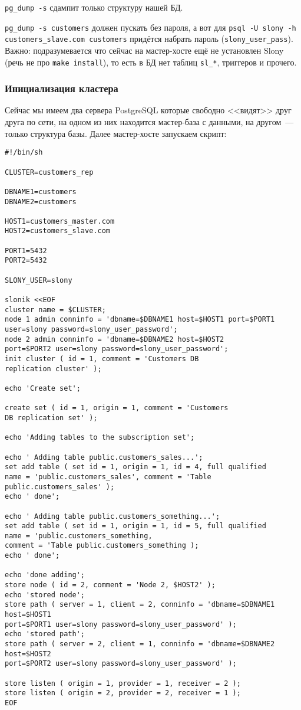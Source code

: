 \lstinline!pg_dump -s! сдампит только структуру нашей БД.

\lstinline!pg_dump -s customers! должен пускать без пароля, а вот для \lstinline!psql -U slony -h customers_slave.com customers! придётся набрать пароль (\lstinline!slony_user_pass!). Важно: подразумевается что сейчас на мастер-хосте ещё не установлен Slony (речь не про \lstinline!make install!), то есть в БД нет таблиц \lstinline!sl_*!, триггеров и прочего.

\subsubsection{Инициализация кластера}

Сейчас мы имеем два сервера PostgreSQL которые свободно <<видят>> друг друга по сети, на одном из них находится мастер-база с данными, на другом~--- только структура базы. Далее мастер-хосте запускаем скрипт:

\begin{lstlisting}[label=lst:slony9,caption=Инициализация кластера]
#!/bin/sh

CLUSTER=customers_rep

DBNAME1=customers
DBNAME2=customers

HOST1=customers_master.com
HOST2=customers_slave.com

PORT1=5432
PORT2=5432

SLONY_USER=slony

slonik <<EOF
cluster name = $CLUSTER;
node 1 admin conninfo = 'dbname=$DBNAME1 host=$HOST1 port=$PORT1
user=slony password=slony_user_password';
node 2 admin conninfo = 'dbname=$DBNAME2 host=$HOST2
port=$PORT2 user=slony password=slony_user_password';
init cluster ( id = 1, comment = 'Customers DB
replication cluster' );

echo 'Create set';

create set ( id = 1, origin = 1, comment = 'Customers
DB replication set' );

echo 'Adding tables to the subscription set';

echo ' Adding table public.customers_sales...';
set add table ( set id = 1, origin = 1, id = 4, full qualified
name = 'public.customers_sales', comment = 'Table public.customers_sales' );
echo ' done';

echo ' Adding table public.customers_something...';
set add table ( set id = 1, origin = 1, id = 5, full qualified
name = 'public.customers_something,
comment = 'Table public.customers_something );
echo ' done';

echo 'done adding';
store node ( id = 2, comment = 'Node 2, $HOST2' );
echo 'stored node';
store path ( server = 1, client = 2, conninfo = 'dbname=$DBNAME1 host=$HOST1
port=$PORT1 user=slony password=slony_user_password' );
echo 'stored path';
store path ( server = 2, client = 1, conninfo = 'dbname=$DBNAME2 host=$HOST2
port=$PORT2 user=slony password=slony_user_password' );

store listen ( origin = 1, provider = 1, receiver = 2 );
store listen ( origin = 2, provider = 2, receiver = 1 );
EOF
\end{lstlisting}

